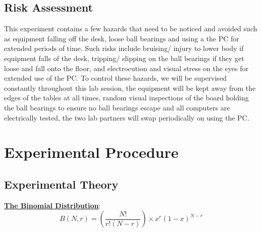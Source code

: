 \documentclass[11pt]{article}
\begin{document}
\subsection{Risk Assessment}
\label{Risk Assessment SubSection}

This experiment contains a few hazards that need to be noticed and avoided such as equipment falling off the desk, loose ball bearings and using a the PC for extended periods of time. Such risks include bruising/ injury to lower body if equipment falls of the desk, tripping/ slipping on the ball bearings if they get loose and fall onto the floor, and electrocution and visual stress on the eyes for extended use of the PC. To control these hazards, we will be supervised constantly throughout this lab session, the equipment will be kept away from the edges of the tables at all times, random visual inspections of the board holding the ball bearings to ensure no ball bearings escape and all computers are electrically tested, the two lab partners will swap periodically on using the PC. 


\section{Experimental Procedure}
\label{Experimental Procedure Section}


\subsection{Experimental Theory}
\label{Experimental Theory SubSection}

\underline{\textbf{The Binomial Distribution}}:\\

\begin{equation} \label{The Binomial Distribution Equation}
B(N,r) = \left(\dfrac{N!}{r!(N-r)}\right) \times x^r (1-x)^{N-r}
\end{equation}
\end{document}
